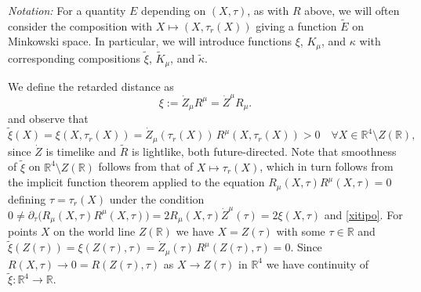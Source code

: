 \documentclass[sumlimits,intlimits,namelimits%
]{amsart}
\newcommand{\mb}[1]{\ensuremath{\mathbb{#1}}}
\newcommand{\R}{\mb{R}}
\renewcommand{\d}{\ensuremath{\partial}}
\theoremstyle{definition}
\newcommand{\beq}{\begin{equation}}
\newcommand{\eeq}{\end{equation}}
\newcommand{\col}{\colon}
\begin{document}
\emph{Notation:}  For a quantity $E$ depending on $(X,\tau)$, as with $R$ above, we will often consider the composition with $X \mapsto (X, \tau_r(X))$ giving a function $\widetilde{E}$ on Minkowski space. In particular, we will introduce functions $\xi$, $K_\mu$, and $\kappa$ with corresponding compositions $\widetilde{\xi}$, $\widetilde{K}_\mu$, and $\widetilde{\kappa}$. 

We define the retarded distance as 
\beq \label{XiZR}
\xi:=\dot{Z}_\mu R^\mu = \dot{Z}^\mu R_\mu.  
\eeq
and  observe that 
\beq\label{xitipo}
   \widetilde{\xi}(X) = \xi(X,\tau_r(X)) = \dot{Z}_\mu(\tau_r(X)) \, R^\mu(X,\tau_r(X)) > 0 \quad \forall X \in \R^4 \setminus Z(\R),
\eeq
since $\dot{Z}$ is timelike and $\tilde{R}$ is lightlike, both future-directed. Note that smoothness of $\widetilde{\xi}$ on $\R^4 \setminus Z(\R)$ follows from that of $X \mapsto \tau_r(X)$, which in turn follows from the implicit function theorem applied to the equation $R_\mu(X,\tau) R^\mu(X,\tau) = 0$ defining $\tau = \tau_r(X)$ under the condition $0 \neq \d_\tau \big( R_\mu(X,\tau) R^\mu(X,\tau) \big) = 2 R_\mu(X,\tau) \dot{Z}^\mu(\tau) = 2 \xi(X,\tau)$ and \eqref{xitipo}. For points $X$ on the world line $Z(\R)$ we have $X = Z(\tau)$ with some $\tau \in \R$ and $\widetilde{\xi}(Z(\tau)) = \xi(Z(\tau),\tau) = \dot{Z}_\mu(\tau) \, R^\mu(Z(\tau),\tau) = 0$. Since $R(X,\tau) \to 0 = R(Z(\tau),\tau)$ as $X \to Z(\tau)$ in $\R^4$ we have continuity of $\widetilde{\xi} \col \R^4 \to \R$.
\end{document}
